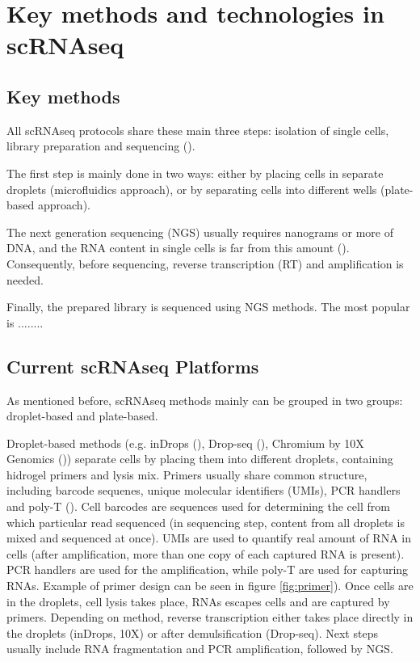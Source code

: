 \section{Key methods and technologies in scRNAseq}

\subsection{Key methods}

All scRNAseq protocols share these main three steps:
isolation of single cells, library preparation and sequencing (\cite{Andrews2018}).

The first step is mainly done in two ways:
either by placing cells in separate droplets (microfluidics approach),
or by separating cells into different wells (plate-based approach).

The next generation sequencing (NGS) usually requires nanograms or more of DNA,
and the RNA content in single cells is far from this amount (\cite{Wu2017}).
Consequently, before sequencing, reverse transcription (RT) and amplification is needed.

Finally, the prepared library is sequenced using NGS methods.
The most popular is ........

\subsection{Current scRNAseq Platforms}

As mentioned before, scRNAseq methods mainly can be grouped in two groups: droplet-based and plate-based.

Droplet-based methods (e.g. inDrops (\cite{Klein2015}), Drop-seq (\cite{Macosko2015}),
Chromium by 10X Genomics (\cite{Zheng2017}))
separate cells by placing them into different droplets, containing hidrogel primers and lysis mix.
Primers usually share common structure, including barcode sequenes, unique molecular identifiers (UMIs),
PCR handlers and poly-T (\cite{Zhang2019}).
Cell barcodes are sequences used for determining the cell from which particular read sequenced
(in sequencing step, content from all droplets is mixed and sequenced at once).
UMIs are used to quantify real amount of RNA in cells
(after amplification, more than one copy of each captured RNA is present).
PCR handlers are used for the amplification, while poly-T are used for capturing RNAs.
Example of primer design can be seen in figure \ref{fig:primer}).
Once cells are in the droplets, cell lysis takes place, RNAs escapes cells and are captured by primers.
Depending on method,
reverse transcription either takes place directly in the droplets (inDrops, 10X) or after demulsification (Drop-seq).
Next steps usually include RNA fragmentation and PCR amplification, followed by NGS.

